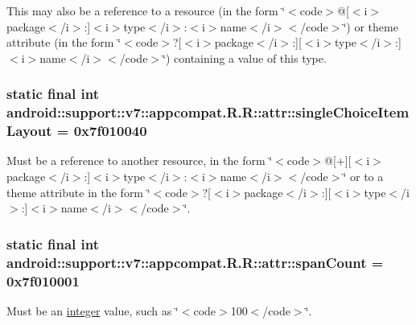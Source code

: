 This may also be a reference to a resource (in the form \char`\"{}$<$code$>$@\mbox{[}$<$i$>$package$<$/i$>$:\mbox{]}$<$i$>$type$<$/i$>$:$<$i$>$name$<$/i$>$$<$/code$>$\char`\"{}) or theme attribute (in the form \char`\"{}$<$code$>$?\mbox{[}$<$i$>$package$<$/i$>$:\mbox{]}\mbox{[}$<$i$>$type$<$/i$>$:\mbox{]}$<$i$>$name$<$/i$>$$<$/code$>$\char`\"{}) containing a value of this type. \hypertarget{classandroid_1_1support_1_1v7_1_1appcompat_1_1_r_1_1attr_ff5f0196bcdb90cf8d2d2ba327b46583}{
\subsubsection[{singleChoiceItemLayout}]{\setlength{\rightskip}{0pt plus 5cm}static final int android::support::v7::appcompat.R.R::attr::singleChoiceItemLayout = 0x7f010040}}
\label{classandroid_1_1support_1_1v7_1_1appcompat_1_1_r_1_1attr_ff5f0196bcdb90cf8d2d2ba327b46583}


Must be a reference to another resource, in the form \char`\"{}$<$code$>$@\mbox{[}+\mbox{]}\mbox{[}$<$i$>$package$<$/i$>$:\mbox{]}$<$i$>$type$<$/i$>$:$<$i$>$name$<$/i$>$$<$/code$>$\char`\"{} or to a theme attribute in the form \char`\"{}$<$code$>$?\mbox{[}$<$i$>$package$<$/i$>$:\mbox{]}\mbox{[}$<$i$>$type$<$/i$>$:\mbox{]}$<$i$>$name$<$/i$>$$<$/code$>$\char`\"{}. \hypertarget{classandroid_1_1support_1_1v7_1_1appcompat_1_1_r_1_1attr_d225375ed3d6eefe8afa82c6b0e4a982}{
\subsubsection[{spanCount}]{\setlength{\rightskip}{0pt plus 5cm}static final int android::support::v7::appcompat.R.R::attr::spanCount = 0x7f010001}}
\label{classandroid_1_1support_1_1v7_1_1appcompat_1_1_r_1_1attr_d225375ed3d6eefe8afa82c6b0e4a982}


Must be an \hyperlink{classandroid_1_1support_1_1v7_1_1appcompat_1_1_r_1_1integer}{integer} value, such as \char`\"{}$<$code$>$100$<$/code$>$\char`\"{}. 

